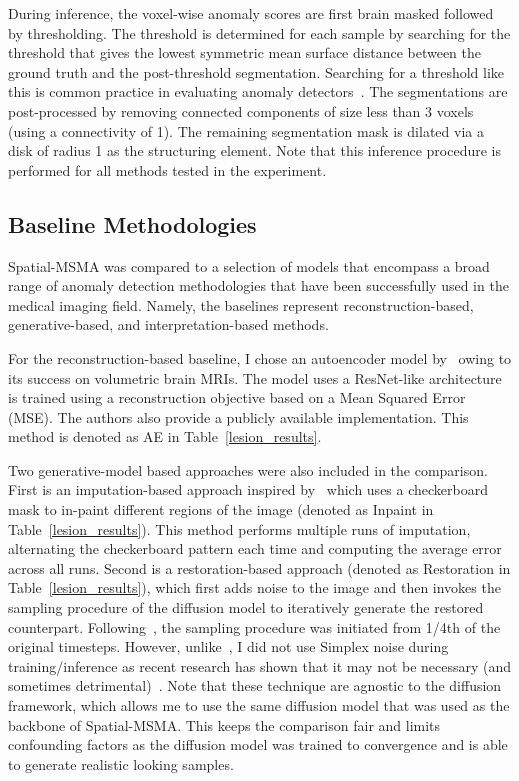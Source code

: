 During inference, the voxel-wise anomaly scores are first brain masked followed by thresholding. The threshold is determined for each sample by searching for the threshold that gives the lowest symmetric mean surface distance between the ground truth and the post-threshold segmentation. Searching for a threshold like this is common practice in evaluating anomaly detectors~\cite{baur_deep_2019}. The segmentations are post-processed by removing connected components of size less than 3 voxels (using a connectivity of 1). The remaining segmentation mask is dilated via a disk of radius 1 as the structuring element. Note that this inference procedure is performed for all methods tested in the experiment.

\subsection*{Baseline Methodologies}

Spatial-MSMA was compared to a selection of models that encompass a broad range of anomaly detection methodologies that have been successfully used in the medical imaging field. Namely, the baselines represent reconstruction-based, generative-based, and interpretation-based methods.

For the reconstruction-based baseline, I chose an autoencoder model by~\cite{aelu2023} owing to its success on volumetric brain MRIs. The model uses a ResNet-like architecture is trained using a reconstruction objective based on a Mean Squared Error (MSE). The authors also provide a publicly available implementation. This method is denoted as AE in Table~\ref{lesion_results}.

Two generative-model based approaches were also included in the comparison. First is an imputation-based approach inspired by~\cite{liuUnsupervisedOutofDistributionDetection2023} which uses a checkerboard mask to in-paint different regions of the image (denoted as Inpaint in Table~\ref{lesion_results}). This method performs multiple runs of imputation, alternating the checkerboard pattern each time and computing the average error across all runs. Second is a restoration-based approach (denoted as Restoration in Table~\ref{lesion_results}), which first adds noise to the image and then invokes the sampling procedure of the diffusion model to iteratively generate the restored counterpart. Following~\cite{wyattAnoddpmAnomalyDetection2022}, the sampling procedure was initiated from 1/4th of the original timesteps. However, unlike~\cite{wyattAnoddpmAnomalyDetection2022}, I did not use Simplex noise during training/inference as recent research has shown that it may not be necessary (and sometimes detrimental)~\cite{kascenas2023}. Note that these technique are agnostic to the diffusion framework, which allows me to use the same diffusion model that was used as the backbone of Spatial-MSMA. This keeps the comparison fair and limits confounding factors as the diffusion model was trained to convergence and is able to generate realistic looking samples.

